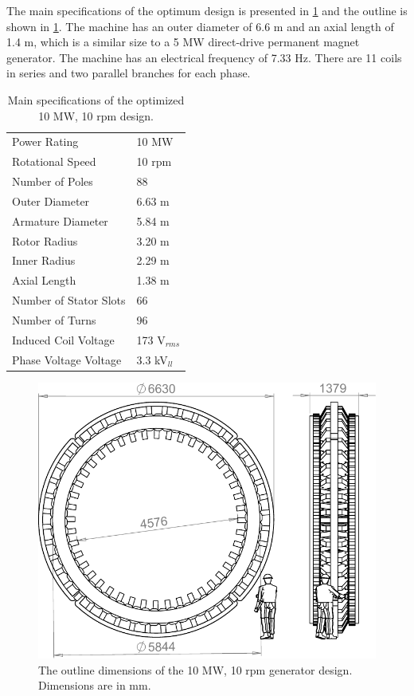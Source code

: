 \documentclass[12pt]{iopart}
\begin{document}
The main specifications of the optimum design is presented in \ref{10MW_spec} and the outline is shown in \ref{10MW_drawing}. The machine has an outer diameter of 6.6 m and an axial length of 1.4 m, which is a similar size to a 5 MW direct-drive permanent magnet generator. The machine has an electrical frequency of 7.33 Hz. There are 11 coils in series and two parallel branches for each phase.

\begin{table}[]
  \centering
  \begin{tabular}{ll}
\hline
Power Rating & 10 MW \\
Rotational Speed & 10 rpm \\
Number of Poles & 88 \\
\hline
Outer Diameter & 6.63 m \\
Armature Diameter & 5.84 m \\
Rotor Radius & 3.20 m \\
Inner Radius & 2.29 m \\
Axial Length & 1.38 m \\
\hline
Number of Stator Slots & 66 \\
Number of Turns & 96 \\
Induced Coil Voltage & 173 V$_{rms}$\\
Phase Voltage Voltage & 3.3 kV$_{ll}$ \\
\hline
 \end{tabular}
  \caption{Main specifications of the optimized 10 MW, 10 rpm design.}
  \label{10MW_spec}
\end{table}

\begin{figure}[]
  \centering
    \includegraphics[]{10MW_outline_drawing}
  \caption{The outline dimensions of the 10 MW, 10 rpm generator design. Dimensions are in mm.}
  \label{10MW_drawing}
\end{figure}
\end{document}
